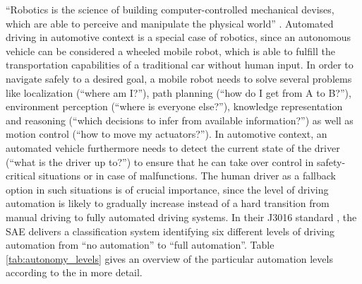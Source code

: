 \enquote{Robotics is the science of building computer-controlled mechanical devises, which are able to perceive and manipulate the physical world} \parencite{Thrun2005}.
Automated driving in automotive context is a special case of robotics, since an autonomous vehicle can be considered a wheeled mobile robot, which is able to fulfill the transportation capabilities of a traditional car without human input.
In order to navigate safely to a desired goal, a mobile robot needs to solve several problems like localization (\enquote{where am I?}), path planning (\enquote{how do I get from A to B?}), environment perception (\enquote{where is everyone else?}), knowledge representation and reasoning (\enquote{which decisions to infer from available information?}) as well as motion control (\enquote{how to move my actuators?}).
In automotive context, an automated vehicle furthermore needs to detect the current state of the driver (\enquote{what is the driver up to?}) to ensure that he can take over control in safety-critical situations or in case of malfunctions.
The human driver as a fallback option in such situations is of crucial importance, since the level of driving automation is likely to gradually increase instead of a hard transition from manual driving to fully automated driving systems.
In their J3016 standard , the \ac{SAE} delivers a classification system identifying six different levels of driving automation from \enquote{no automation} to \enquote{full automation}.
Table \ref{tab:autonomy_levels} gives an overview of the particular automation levels according to the \textcite{SAE_J3016} in more detail.

